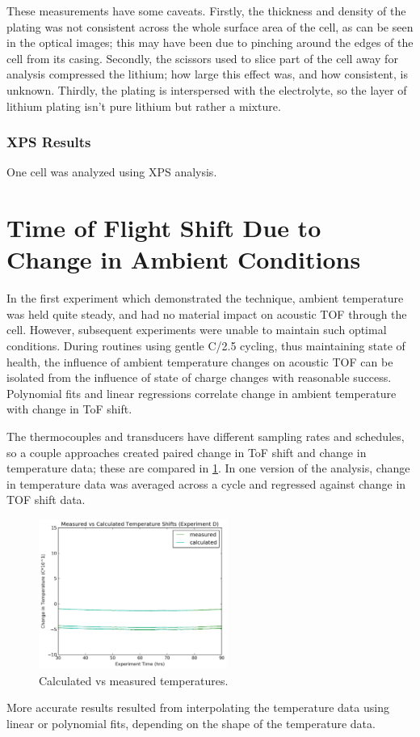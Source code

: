 These measurements have some caveats. 
Firstly, the thickness and density of the plating was not consistent across the whole surface area of the cell, as can be seen in the optical images; this may have been due to pinching around the edges of the cell from its casing.
Secondly, the scissors used to slice part of the cell away for analysis compressed the lithium; how large this effect was, and how consistent, is unknown. 
Thirdly, the plating is interspersed with the electrolyte, so the layer of lithium plating isn't pure lithium but rather a mixture.


\subsubsection{XPS Results}
One cell was analyzed using XPS analysis.


\section{Time of Flight Shift Due to Change in Ambient Conditions}
In the first experiment which demonstrated the technique, ambient temperature was held quite steady, and had no material impact on acoustic TOF through the cell. 
However, subsequent experiments were unable to maintain such optimal conditions.
During routines using gentle C/2.5 cycling, thus maintaining state of health, the influence of ambient temperature changes on acoustic TOF can be isolated from the influence of state of charge changes with reasonable success. 
Polynomial fits and linear regressions correlate change in ambient temperature with change in ToF shift. 

The thermocouples and transducers have different sampling rates and schedules, so a couple approaches created paired change in ToF shift and change in temperature data; these are compared in \hyperref[fig:0417temp]{\cref{fig:0417temp}}. 
In one version of the analysis, change in temperature data was averaged across a cycle and regressed against change in TOF shift data. 
\begin{figure}[t]\label{fig:0417temp}
    \includegraphics[width=0.55\textwidth]{0417temp.png}
    \centering
    \caption{Calculated vs measured temperatures.}
\end{figure}
More accurate results resulted from interpolating the temperature data using linear or polynomial fits, depending on the shape of the temperature data.

